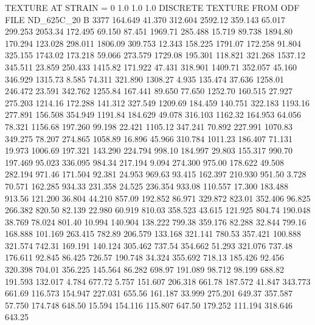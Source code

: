 TEXTURE AT STRAIN = 0
1.0   1.0   1.0
DISCRETE TEXTURE FROM ODF FILE ND_625C_20
B 3377
 164.649   41.370  312.604      2592.12
 359.143   65.017  299.253      2053.34
 172.495   69.150   87.451      1969.71
 285.488   15.719   89.738      1894.80
 170.294  123.028  298.011      1806.09
 309.753   12.343  158.225      1791.07
 172.258   91.804  325.155      1743.02
 173.218   59.066  273.579      1729.08
 195.301  118.821  321.268      1537.12
 345.511   23.859  250.433      1415.82
 171.922   47.431  318.901      1409.71
 352.057   45.160  346.929      1315.73
   8.585   74.311  321.890      1308.27
   4.935  135.474   37.636      1258.01
 246.472   23.591  342.762      1255.84
 167.441   89.650   77.650      1252.70
 160.515   27.927  275.203      1214.16
 172.288  141.312  327.549      1209.69
 184.459  140.751  322.183      1193.16
 277.891  156.508  354.949      1191.84
 184.629   49.078  316.103      1162.32
 164.953   64.056   78.321      1156.68
 197.260   99.198   22.421      1105.12
 347.241   70.892  227.991      1070.83
 349.275   78.207  274.865      1058.89
  16.896   45.966  310.784      1011.23
 186.407   71.131   19.973      1006.69
 197.321  143.290  224.794       998.10
 184.997   29.803  155.317       990.70
 197.469   95.023  336.095       984.34
 217.194    9.094  274.300       975.00
 178.622   49.508  282.194       971.46
 171.504   92.381   24.953       969.63
  93.415  162.397  210.930       951.50
   3.728   70.571  162.285       934.33
 231.358   24.525  236.354       933.08
 110.557   17.300  183.488       913.56
 121.200   36.804   44.210       857.09
 192.852   86.971  329.872       823.01
 352.406   96.825  266.382       820.50
  82.139   22.980   60.919       810.03
 358.523   43.615  121.925       804.74
 190.048   38.769   78.024       801.40
  10.994  140.904  138.222       799.38
 359.176   82.288   32.844       799.16
 168.888  101.169  263.415       782.89
 206.579  133.168  321.141       780.53
 357.421  100.888  321.574       742.31
 169.191  140.124  305.462       737.54
 354.662   51.293  321.076       737.48
 176.611   92.845   86.425       726.57
 190.748   34.324  355.692       718.13
 185.426   92.456  320.398       704.01
 356.225  145.564   86.282       698.97
 191.089   98.712   98.199       688.82
 191.593  132.017    4.784       677.72
   5.757  151.607  206.318       661.78
 187.572   41.847  343.773       661.69
 116.573  154.947  227.031       655.56
 161.187   33.999  275.201       649.37
 357.587   57.750  174.748       648.50
  15.594  154.116  115.807       647.50
 179.252  111.194  318.646       643.25
